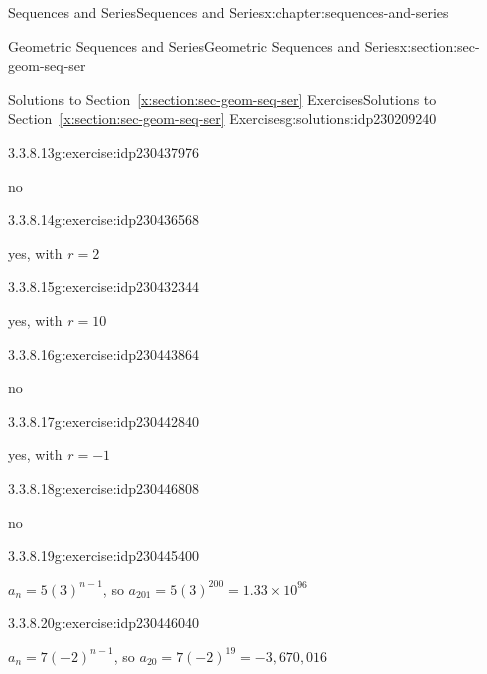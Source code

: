 \documentclass[twoside,10pt,]{book}
\newcommand{\xreffont}{\relax}
\numberwithin{equation}{section}
\begin{document}
\begin{chapterptx}{Sequences and Series}{}{Sequences and Series}{}{}{x:chapter:sequences-and-series}
\begin{sectionptx}{Geometric Sequences and Series}{}{Geometric Sequences and Series}{}{}{x:section:sec-geom-seq-ser}
\begin{solutions-subsection}{Solutions to Section~{\xreffont\ref*{x:section:sec-geom-seq-ser}} Exercises}{}{Solutions to Section~{\xreffont\ref*{x:section:sec-geom-seq-ser}} Exercises}{}{}{g:solutions:idp230209240}
\par\medskip\noindent
\begin{exercisegroup}
\begin{divisionsolutioneg}{3.3.8.13}{}{g:exercise:idp230437976}%
\par\smallskip%
\noindent\hypertarget{g:solution:idp230435544-main}{}no\end{divisionsolutioneg}%
\begin{divisionsolutioneg}{3.3.8.14}{}{g:exercise:idp230436568}%
\par\smallskip%
\noindent\hypertarget{g:solution:idp230437464-main}{}yes, with \(r=2\)\end{divisionsolutioneg}%
\begin{divisionsolutioneg}{3.3.8.15}{}{g:exercise:idp230432344}%
\par\smallskip%
\noindent\hypertarget{g:solution:idp230443608-main}{}yes, with \(r=10\)\end{divisionsolutioneg}%
\begin{divisionsolutioneg}{3.3.8.16}{}{g:exercise:idp230443864}%
\par\smallskip%
\noindent\hypertarget{g:solution:idp230445016-main}{}no\end{divisionsolutioneg}%
\begin{divisionsolutioneg}{3.3.8.17}{}{g:exercise:idp230442840}%
\par\smallskip%
\noindent\hypertarget{g:solution:idp230446552-main}{}yes, with \(r=-1\)\end{divisionsolutioneg}%
\begin{divisionsolutioneg}{3.3.8.18}{}{g:exercise:idp230446808}%
\par\smallskip%
\noindent\hypertarget{g:solution:idp230447320-main}{}no\end{divisionsolutioneg}%
\end{exercisegroup}
\par\medskip\noindent
\begin{divisionsolution}{3.3.8.19}{}{g:exercise:idp230445400}%
\par\smallskip%
\noindent\hypertarget{g:solution:idp230439896-main}{}\({a_n} = 5{\left( 3 \right)^{n - 1}}\), so \(a_{201} = 5(3)^{200} = 1.33 \times 10^{96}\)\end{divisionsolution}%
\begin{divisionsolution}{3.3.8.20}{}{g:exercise:idp230446040}%
\par\smallskip%
\noindent\hypertarget{g:solution:idp230447064-main}{}\({a_n} = 7{\left( { - 2} \right)^{n - 1}}\), so \(a_{20} = 7(-2)^{19} = -3,670,016\)\end{divisionsolution}%

\end{solutions-subsection}
\end{sectionptx}
\end{chapterptx}
\end{document}
